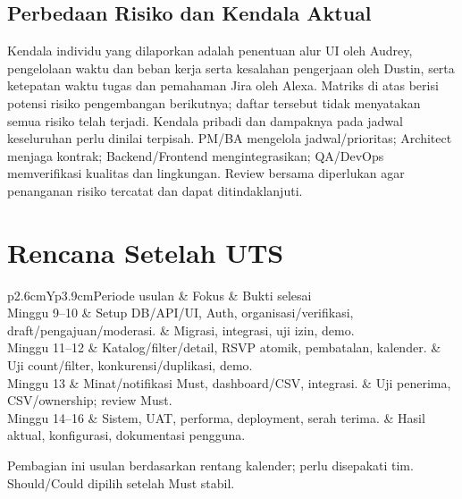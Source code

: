\documentclass[11pt,a4paper]{article}
\newcommand{\tbl}[2]{\par\smallskip\noindent\begin{tabularx}{\linewidth}{#1}\toprule #2\bottomrule\end{tabularx}\par\smallskip}
\newcommand{\page}[1]{\clearpage\section{#1}}
\begin{document}
\subsection{Perbedaan Risiko dan Kendala Aktual}
Kendala individu yang dilaporkan adalah penentuan alur UI oleh Audrey, pengelolaan waktu dan beban kerja serta kesalahan pengerjaan oleh Dustin, serta ketepatan waktu tugas dan pemahaman Jira oleh Alexa. Matriks di atas berisi potensi risiko pengembangan berikutnya; daftar tersebut tidak menyatakan semua risiko telah terjadi. Kendala pribadi dan dampaknya pada jadwal keseluruhan perlu dinilai terpisah. \cite{audreyind,dustinind,alexaind}
PM/BA mengelola jadwal/prioritas; Architect menjaga kontrak; Backend/Frontend mengintegrasikan; QA/DevOps memverifikasi kualitas dan lingkungan. Review bersama diperlukan agar penanganan risiko tercatat dan dapat ditindaklanjuti.
\page{Rencana Setelah UTS}
\tbl{p{2.6cm}Yp{3.9cm}}{Periode usulan & Fokus & Bukti selesai\\\midrule
Minggu 9--10 & Setup DB/API/UI, Auth, organisasi/verifikasi, draft/pengajuan/moderasi. & Migrasi, integrasi, uji izin, demo.\\
Minggu 11--12 & Katalog/filter/detail, RSVP atomik, pembatalan, kalender. & Uji count/filter, konkurensi/duplikasi, demo.\\
Minggu 13 & Minat/notifikasi Must, dashboard/CSV, integrasi. & Uji penerima, CSV/ownership; review Must.\\
Minggu 14--16 & Sistem, UAT, performa, deployment, serah terima. & Hasil aktual, konfigurasi, dokumentasi pengguna.\\}
Pembagian ini usulan berdasarkan rentang kalender; perlu disepakati tim. Should/Could dipilih setelah Must stabil.
\end{document}
